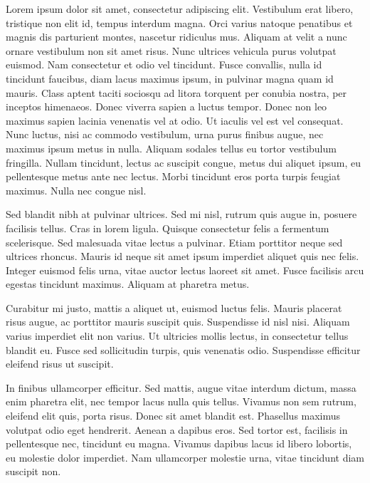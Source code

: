 \documentclass[bigfont, nodocument,nologo,black]{europasscv}
\begin{document}
\ecvLeftColumnWidth{0mm}
\hspace*{-1cm}
\ecvLeftColumnWidth{0mm}
\ecvColSep{0pt}
\begin{minipage}[t]{\linewidth}
	\begin{europasscv}
	\begin{singlespace*}
		\bigbreak	


Lorem ipsum dolor sit amet, consectetur adipiscing elit. Vestibulum erat libero, tristique non elit id, tempus interdum magna. Orci varius natoque penatibus et magnis dis parturient montes, nascetur ridiculus mus. Aliquam at velit a nunc ornare vestibulum non sit amet risus. Nunc ultrices vehicula purus volutpat euismod. Nam consectetur et odio vel tincidunt. Fusce convallis, nulla id tincidunt faucibus, diam lacus maximus ipsum, in pulvinar magna quam id mauris. Class aptent taciti sociosqu ad litora torquent per conubia nostra, per inceptos himenaeos. Donec viverra sapien a luctus tempor. Donec non leo maximus sapien lacinia venenatis vel at odio. Ut iaculis vel est vel consequat. Nunc luctus, nisi ac commodo vestibulum, urna purus finibus augue, nec maximus ipsum metus in nulla. Aliquam sodales tellus eu tortor vestibulum fringilla. Nullam tincidunt, lectus ac suscipit congue, metus dui aliquet ipsum, eu pellentesque metus ante nec lectus. Morbi tincidunt eros porta turpis feugiat maximus. Nulla nec congue nisl. 	\bigbreak	

Sed blandit nibh at pulvinar ultrices. Sed mi nisl, rutrum quis augue in, posuere facilisis tellus. Cras in lorem ligula. Quisque consectetur felis a fermentum scelerisque. Sed malesuada vitae lectus a pulvinar. Etiam porttitor neque sed ultrices rhoncus. Mauris id neque sit amet ipsum imperdiet aliquet quis nec felis. Integer euismod felis urna, vitae auctor lectus laoreet sit amet. Fusce facilisis arcu egestas tincidunt maximus. Aliquam at pharetra metus. 	\bigbreak	

Curabitur mi justo, mattis a aliquet ut, euismod luctus felis. Mauris placerat risus augue, ac porttitor mauris suscipit quis. Suspendisse id nisl nisi. Aliquam varius imperdiet elit non varius. Ut ultricies mollis lectus, in consectetur tellus blandit eu. Fusce sed sollicitudin turpis, quis venenatis odio. Suspendisse efficitur eleifend risus ut suscipit. 	\bigbreak	

In finibus ullamcorper efficitur. Sed mattis, augue vitae interdum dictum, massa enim pharetra elit, nec tempor lacus nulla quis tellus. Vivamus non sem rutrum, eleifend elit quis, porta risus. Donec sit amet blandit est. Phasellus maximus volutpat odio eget hendrerit. Aenean a dapibus eros. Sed tortor est, facilisis in pellentesque nec, tincidunt eu magna. Vivamus dapibus lacus id libero lobortis, eu molestie dolor imperdiet. Nam ullamcorper molestie urna, vitae tincidunt diam suscipit non. 	\bigbreak	


\end{singlespace*}
\end{europasscv}
\end{minipage}
\end{document}
